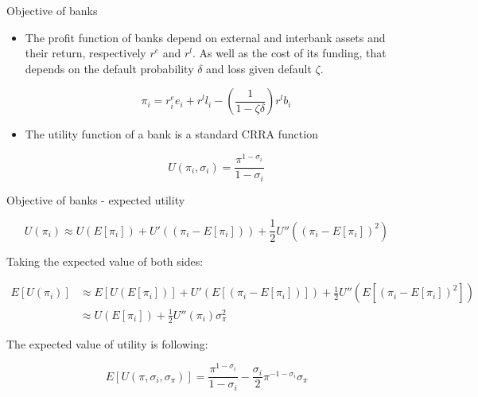 \documentclass{beamer}
\begin{document}
\begin{frame}{Objective of banks}

    \begin{itemize}
        \item The profit function of banks depend on external and interbank assets and their return, respectively $r^e$ and $r^l$. As well as the cost of its funding, that depends on the default probability $\delta$ and loss given default $\zeta$.
        
        \[\pi_i = r_{i}^e e_i + r^l l_i - \left(\frac{1}{1 - \zeta \delta}\right) r^l b_i\]

        \item The utility function of a bank is a standard CRRA function
        
        \[U(\pi_i, \sigma_i) = \frac{\pi^{1-\sigma_i}}{1 - \sigma_i}\]


    \end{itemize}
    
\end{frame}

\begin{frame}{Objective of banks - expected utility}

    \[U(\pi_i) \approx U(E[\pi_i]) + U'((\pi_i - E[\pi_i])) + \frac{1}{2} U''((\pi_i - E[\pi_i])^2)\]

Taking the expected value of both sides:

\begin{equation}
  \begin{aligned}
    E[U(\pi_i)] &\approx E[U(E[\pi_i])] + U'(E[(\pi_i - E[\pi_i])]) + \frac{1}{2} U''(E[(\pi_i - E[\pi_i])^2]) \\
     &\approx U(E[\pi_i]) + \frac{1}{2} U''(\pi_i) \sigma^2_{\pi}
  \end{aligned}\nonumber
\end{equation}

The expected value of utility is following:

\[ E[U(\pi, \sigma_i, \sigma_\pi)] = \frac{\pi^{1-\sigma_i}}{1 - \sigma_i} - \frac{\sigma_i}{2} \pi^{-1-\sigma_i} \sigma_\pi\]

\end{frame}
\end{document}
